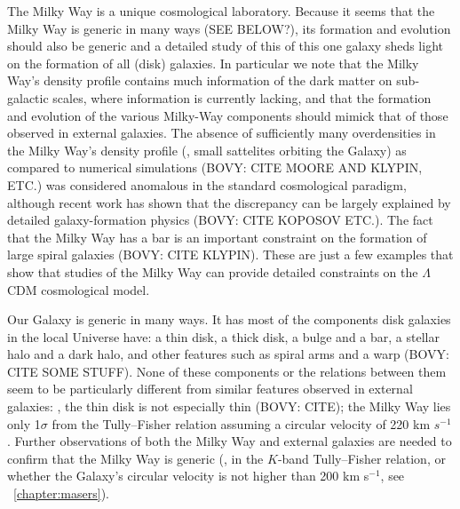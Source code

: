 The Milky Way is a unique cosmological laboratory. Because it seems
that the Milky Way is generic in many ways (SEE BELOW?), its formation
and evolution should also be generic and a detailed study of this of
this one galaxy sheds light on the formation of all (disk)
galaxies. In particular we note that the Milky Way's density profile
contains much information of the dark matter on sub-galactic scales,
where information is currently lacking, and that the formation and
evolution of the various Milky-Way components should mimick that of
those observed in external galaxies. The absence of sufficiently many
overdensities in the Milky Way's density profile (\ie, small
sattelites orbiting the Galaxy) as compared to numerical simulations
(BOVY: CITE MOORE AND KLYPIN, ETC.) was considered anomalous in the
standard cosmological paradigm, although recent work has shown that
the discrepancy can be largely explained by detailed galaxy-formation
physics (BOVY: CITE KOPOSOV ETC.). The fact that the Milky Way has a
bar is an important constraint on the formation of large spiral
galaxies (BOVY: CITE KLYPIN). These are just a few examples that show
that studies of the Milky Way can provide detailed constraints on the
$\Lambda$CDM cosmological model.

Our Galaxy is generic in many ways. It has most of the components disk
galaxies in the local Universe have: a thin disk, a thick disk, a
bulge and a bar, a stellar halo and a dark halo, and other features
such as spiral arms and a warp (BOVY: CITE SOME STUFF). None of these
components or the relations between them seem to be particularly
different from similar features observed in external galaxies: \eg,
the thin disk is not especially thin (BOVY: CITE); the Milky Way lies
only 1$\sigma$ from the Tully--Fisher relation assuming a circular
velocity of 220 km $s^{-1}$ \citep{Flynn06a}. Further observations of
both the Milky Way and external galaxies are needed to confirm that
the Milky Way is generic (\eg, in the $K$-band Tully--Fisher relation,
or whether the Galaxy's circular velocity is not higher than 200 km
s$^{-1}$, see \chaptername~\ref{chapter:masers}). 

